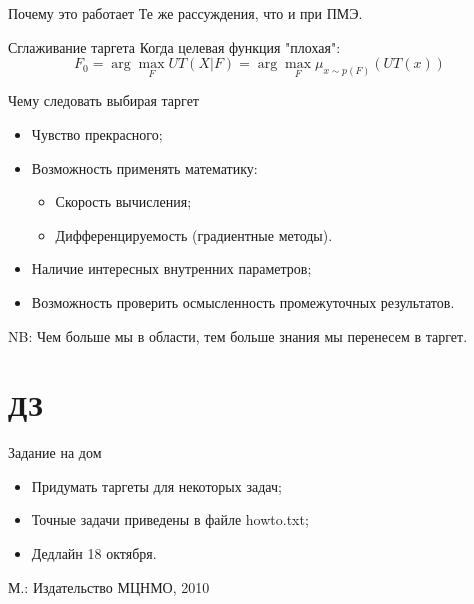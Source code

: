 \documentclass[14pt, fleqn, xcolor={dvipsnames, table}]{beamer}
\begin{document}
\begin{frame}{Почему это работает} %
Те же рассуждения, что и при ПМЭ.
\end{frame}

\begin{frame}{Сглаживание таргета}
\centering
Когда целевая функция "плохая":
$$
F_0 = \arg\max_F UT(X|F) = \arg\max_F \mu_{x \sim p(F)}(UT(x))
$$
\end{frame}

\begin{frame}{Чему следовать выбирая таргет}
\begin{itemize}
  \item Чувство прекрасного;
  \item Возможность применять математику:
  \begin{itemize}
    \item Скорость вычисления;
    \item Дифференцируемость (градиентные методы).
  \end{itemize}
  \item Наличие интересных внутренних параметров;
  \item Возможность проверить осмысленность промежуточных результатов.
\end{itemize}
NB: Чем больше мы в области, тем больше знания мы перенесем в таргет.
\end{frame}

\section{ДЗ}
\begin{frame}{Задание на дом}
\begin{itemize}
  \item Придумать таргеты для некоторых задач; 
  \item Точные задачи приведены в файле howto.txt; 
  \item Дедлайн 18 октября.
\end{itemize}
М.: Издательство МЦНМО, 2010
\end{frame}
\end{document}
